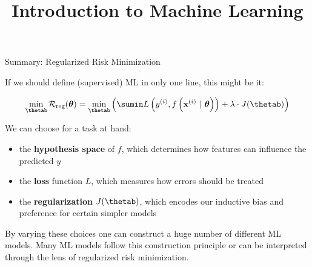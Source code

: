 \documentclass[11pt,compress,t,notes=noshow, xcolor=table]{beamer}
\title{Introduction to Machine Learning}
\begin{document}



\begin{vbframe}{Summary: Regularized Risk Minimization}

If we should define (supervised) ML in only one line, this might be it:

\[
\min_{\thetab} \riskrt= \min_{\thetab} \left(\sumin \Lxyit + \lambda \cdot J(\thetab) \right)
\]

We can choose for a task at hand:

\begin{itemize}
  \item the \textbf{hypothesis space} of $f$, which determines how features can 
  influence the predicted $y$
  \item the \textbf{loss} function $L$, which measures how errors should be treated
  \item the \textbf{regularization} $J(\thetab)$, which encodes our inductive 
  bias and preference for certain simpler models
\end{itemize}

\vfill

By varying these choices one can construct a huge number of different ML models. 
Many ML models follow this construction principle or can be interpreted through 
the lens of regularized risk minimization.

\end{vbframe}
\end{document}
